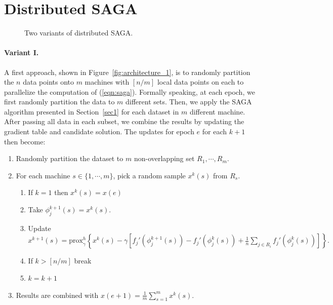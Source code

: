 \documentclass[a4paper,10pt]{article}
\newcommand{\eqnref}[1]{(\ref{eqn:#1})}
\newcommand{\figref}[1]{Figure~\ref{fig:#1}}
\newcommand{\prox}{\textrm{prox}}
\begin{document}
\section{Distributed SAGA}

\begin{figure}[ht]
	\centering
	\hspace{0pt}
	\caption{Two variants of distributed SAGA.}
	\label{2figs-show}
\end{figure}

\paragraph{Variant I.} A first approach, shown in \figref{architecture_1}, is
to randomly partition the $n$ data points onto $m$ machines with $[n/m]$ local
data points on each to parallelize the computation of \eqnref{saga}. Formally
speaking, at each epoch, we first randomly partition the data to $m$ different
sets. Then, we apply the SAGA algorithm presented in Section~\ref{sec1} for each
dataset in $m$ different machine. After passing all data in each subset, we
combine the results by updating the gradient table and candidate solution. The
updates for epoch $e$ for each $k+1$ then become:
\begin{enumerate}
	\item Randomly partition the dataset to $m$ non-overlapping set $R_1, \cdots, R_m$.
	\item For each machine $s \in \{ 1, \cdots, m \}$, pick a random sample $x^k(s)$ from $R_s$.
	\begin{enumerate}
		\item If $ k = 1 $ then $x^k(s) = x(e)$
		\item Take $\phi_j^{k+1}(s) = x^k(s)$.
		\item Update $x^{k+1}(s) = \prox_\gamma^h \left\{ 
			x^k(s) - \gamma \left[ f_j'(\phi_j^{k+1}(s)) - f_j'(\phi_j^k(s))
		+ \frac1n \sum_{j \in R_i} f_j'(\phi_j^k(s)) \right] \right\}.$
		\item If $ k > [n/m]$ break
		\item $k = k+1$
	\end{enumerate}	
	\item Results are combined with $ x(e+1) = \frac{1}{m} \sum_{s=1}^m x^k(s)$.
\end{enumerate}
\end{document}
